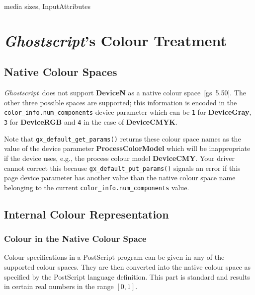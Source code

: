 \documentclass[twoside,a4paper]{article}
\newcommand{\Gs}{\textit{Ghostscript\/}}
\newcommand{\ps}[1]{{\sffamily\bfseries #1}}	%
\newcommand{\prog}[1]{\texttt{#1}}
\newif\ifdraft \draftfalse
\begin{document}
media sizes, InputAttributes
\fi


\section{\Gs's Colour Treatment}


\subsection{Native Colour Spaces}	\label{NativeColourSpaces}

\Gs\ does not support \ps{DeviceN} as a native colour space~[gs~5.50].
The other three possible spaces are supported;
this information is encoded in the \prog{color\_info.num\_components}
device parameter 
which can be \prog{1} for \ps{DeviceGray},
\prog{3} for \ps{DeviceRGB} and \prog{4} in the case of \ps{DeviceCMYK}.

Note that \prog{gx\_default\_get\_params()} returns these colour space names
as the value of the device parameter 
\ps{ProcessColorModel} which will be inappropriate if the device uses, e.g.,
the process colour model \ps{DeviceCMY}.
Your driver cannot correct this because
\prog{gx\_default\_put\_params()} signals an error if this
page device parameter has another value than the native colour space name
belonging to the current \prog{color\_info.num\_components} value.


\ifdraft

\subsection{Internal Colour Representation}

\subsubsection{Colour in the Native Colour Space}

Colour specifications in a PostScript program can be given in any of the
supported colour spaces.
They are then converted into the native colour space as specified by the
PostScript language definition.
This part is standard and results in certain real numbers
in the range $[0, 1]$.
\end{document}
